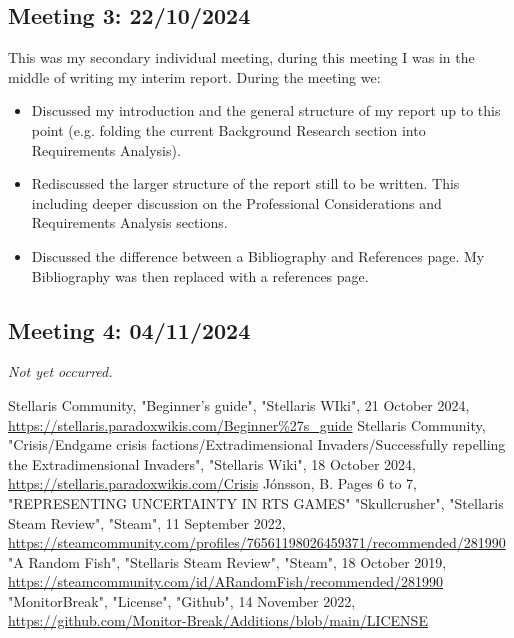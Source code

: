 \documentclass{report}
\begin{document}
\subsection{Meeting 3: 22/10/2024}

This was my secondary individual meeting, during this meeting I was in the middle of writing my interim report. During the meeting we:
\begin{itemize}
  \item Discussed my introduction and the general structure of my report up to this point (e.g. folding the current Background Research section into Requirements Analysis).
  \item Rediscussed the larger structure of the report still to be written. This including deeper discussion on the Professional Considerations and Requirements Analysis sections.
  \item Discussed the difference between a Bibliography and References page. My Bibliography was then replaced with a references page.
\end{itemize}

\subsection{Meeting 4: 04/11/2024}

\textit{Not yet occurred.}

\renewcommand\bibname{References}
\begin{thebibliography}{9}
Stellaris Community, "Beginner's guide", "Stellaris WIki", 21 October 2024, \href{https://stellaris.paradoxwikis.com/Beginner\%27s_guide}{https://stellaris.paradoxwikis.com/Beginner\%27s\_guide}
Stellaris Community, "Crisis/Endgame crisis factions/Extradimensional Invaders/Successfully repelling the Extradimensional Invaders", "Stellaris Wiki", 18 October 2024, \href{https://stellaris.paradoxwikis.com/Crisis#Successfully_repelling_the_Extradimensional_Invaders, Crisis Solution Link}{https://stellaris.paradoxwikis.com/Crisis}
Jónsson, B. Pages 6 to 7, "REPRESENTING UNCERTAINTY IN RTS GAMES"
"Skullcrusher", "Stellaris Steam Review", "Steam", 11 September 2022, \href{https://steamcommunity.com/profiles/76561198026459371/recommended/281990, "Review Link"}{https://steamcommunity.com/profiles/76561198026459371/recommended/281990}
"A Random Fish", "Stellaris Steam Review", "Steam", 18 October 2019, \href{https://steamcommunity.com/id/ARandomFish/recommended/281990, "Review Link"}{https://steamcommunity.com/id/ARandomFish/recommended/281990}
"MonitorBreak", "License", "Github", 14 November 2022, \href{https://github.com/Monitor-Break/Additions/blob/main/LICENSE}{https://github.com/Monitor-Break/Additions/blob/main/LICENSE}
\end{thebibliography}
\end{document}
